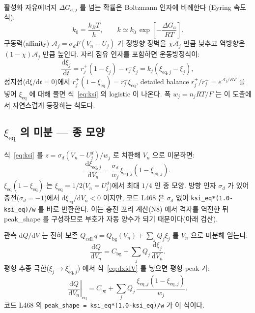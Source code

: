\documentclass[11pt,a4paper]{article}
\newcommand{\dd}{\mathrm{d}}
\newcommand{\eq}{\mathrm{eq}}
\newcommand{\cell}{\mathrm{cell}}
\newcommand{\bg}{\mathrm{bg}}
\begin{document}
활성화 자유에너지 $\Delta G_{a,j}$ 를 넘는 확률은 Boltzmann 인자에 비례한다
(Eyring 속도식):
\begin{equation}
k_0 = \frac{k_B T}{h}, \qquad k \simeq k_0\,\exp\!\left[-\frac{\Delta G_a}{RT}\right].
\label{eq:eyring}
\end{equation}
구동력(affinity) $\mathcal{A}_j = \sigma_d F(V_n - U_j)$ 가 정방향 장벽을 $\chi\mathcal{A}_j$
만큼 낮추고 역방향은 $(1-\chi)\mathcal{A}_j$ 만큼 높인다. 자리 점유 인자를 포함하면
운동방정식이:
\begin{equation}
\frac{\dd\xi_j}{\dd t} = r_j^+(1-\xi_j) - r_j^-\xi_j = k_j(\xi_{\eq,j}-\xi_j),
\label{eq:relax}
\end{equation}
정지점($\dd\xi/\dd t=0$)에서 $r_j^+(1-\xi_{\eq})=r_j^-\xi_{\eq}$, detailed balance
$r_j^+/r_j^- = e^{\mathcal{A}_j/RT}$ 를 넣어 $\xi_{\eq}$ 에 대해 풀면 식~\eqref{eq:ksi}
의 logistic 이 나온다. 폭 $w_j=n_jRT/F$ 는 이 도출에서 자연스럽게 등장하는 척도다.

\subsection{$\xi_{\eq}$ 의 미분 — 종 모양}

식~\eqref{eq:ksi} 를 $z=\sigma_d(V_n-U_j^d)/w_j$ 로 치환해 $V_n$ 으로 미분하면:
\begin{equation}
\frac{\dd\xi_{\eq,j}}{\dd V_n}
= \frac{\sigma_d}{w_j}\,\xi_{\eq,j}(1-\xi_{\eq,j}).
\label{eq:dxidV}
\end{equation}
$\xi_{\eq}(1-\xi_{\eq})$ 는 $\xi_{\eq}=1/2$($V_n=U_j^d$)에서 최대 $1/4$ 인 종 모양.
방향 인자 $\sigma_d$ 가 있어 충전($\sigma_d=-1$)에서 $\dd\xi_{\eq}/\dd V_n < 0$
이지만, 코드 L468 은 $\sigma_d$ 없이 \texttt{ksi\_eq*(1.0-ksi\_eq)/w} 를 바로 반환한다.
이는 충전 꼬리 계산(N8) 에서 격자를 역전한 뒤 peak\_shape 를 구성하므로 부호가 자동 양수가 되기 때문이다(아래 검산).

관측 $\dd Q/\dd V$ 는 전하 보존 $Q_\cell\,q = Q_\bg(V_n) + \sum_jQ_j\xi_j$ 를
$V_n$ 으로 미분해 얻는다:
\begin{equation}
\frac{\dd Q}{\dd V_n} = C_\bg + \sum_j Q_j\,\frac{\dd\xi_j}{\dd V_n}.
\label{eq:dQdV}
\end{equation}
평형 추종 극한($\xi_j\to\xi_{\eq,j}$) 에서 식~\eqref{eq:dxidV} 를 넣으면 평형 peak 가:
\begin{equation}
\boxed{
\left.\frac{\dd Q}{\dd V_n}\right|_{\eq}
= C_\bg + \sum_j Q_j\,\frac{\xi_{\eq,j}(1-\xi_{\eq,j})}{w_j}.}
\label{eq:eqpeak}
\end{equation}
코드 L468 의 \texttt{peak\_shape = ksi\_eq*(1.0-ksi\_eq)/w} 가 이 식이다.
\end{document}
